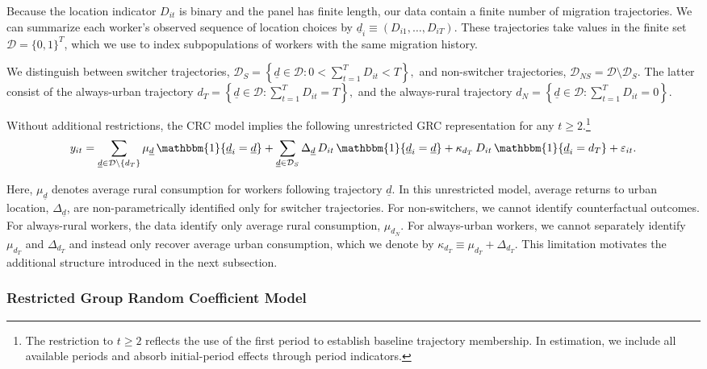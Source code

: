 \documentclass[12pt]{article}
\begin{document}
Because the location indicator $D_{it}$ is binary and the panel has finite length, our data contain a finite number of migration trajectories.
We can summarize each worker's observed sequence of location choices by $\underline d_i\equiv(D_{i1},\dots,D_{iT})$.
These trajectories take values in the finite set $\mathcal D=\{0,1\}^T$, which we use to index subpopulations of workers with the same migration history.

We distinguish between switcher trajectories,
$\mathcal D_S = \left\{ \underline d \in \mathcal D : 0 < \sum_{t=1}^T D_{it} < T \right\},$
and non-switcher trajectories,
$\mathcal D_{NS} = \mathcal D \setminus \mathcal D_S.$
The latter consist of the always-urban trajectory
$d_T = \left\{ \underline d \in \mathcal D : \sum_{t=1}^T D_{it} = T \right\},$ and the always-rural trajectory
$d_N = \left\{ \underline d \in \mathcal D : \sum_{t=1}^T D_{it} = 0 \right\}.$

Without additional restrictions, the CRC model implies the following unrestricted GRC representation for any $t \ge 2$.\footnote{The restriction to $t \ge 2$ reflects the use of the first period to establish baseline trajectory membership. In estimation, we include all available periods and absorb initial-period effects through period indicators.}
\begin{equation}\label{eq:unrestricted-grc-model}
    y_{it}= \sum_{\underline d \in \mathcal D \setminus \{d_T\}}
    \mu_{\underline d}\,\mathbbm{1}\{ \underline d_i=\underline d \} + \sum_{\underline d \in \mathcal D_S}
    \Delta_{\underline d}\, D_{it}\,\mathbbm{1}\{ \underline d_i=\underline d \} + \kappa_{d_T}\, D_{it}\,\mathbbm{1}\{ \underline d_i=d_T \} + \varepsilon_{it}.
\end{equation}

Here, $\mu_{\underline d}$ denotes average rural consumption for workers following trajectory $\underline d$.
In this unrestricted model, average returns to urban location, $\Delta_{\underline d}$, are non-parametrically identified only for switcher trajectories.
For non-switchers, we cannot identify counterfactual outcomes. 
For always-rural workers, the data identify only average rural consumption, $\mu_{d_N}$.
For always-urban workers, we cannot separately identify $\mu_{d_T}$ and $\Delta_{d_T}$ and instead only recover average urban consumption, which we denote by $\kappa_{d_T} \equiv \mu_{d_T} + \Delta_{d_T}$.
This limitation motivates the additional structure introduced in the next subsection.

\subsubsection{Restricted Group Random Coefficient Model}\label{subsec:restricted-grc-model}
\end{document}
